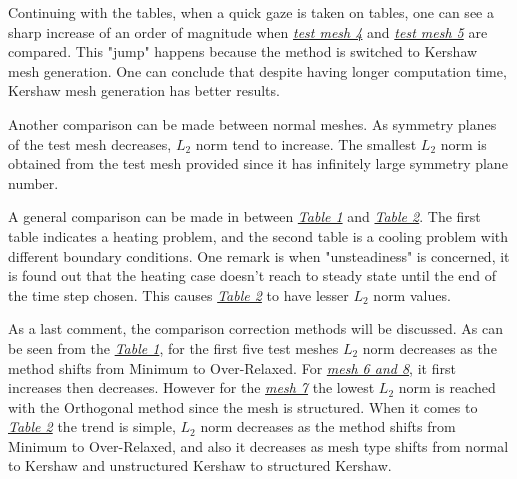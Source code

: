 \documentclass[a4paper, 12pt]{article}
\begin{document}
Continuing with the tables, when a quick gaze is taken on tables, one can see a sharp increase of an order of magnitude when \hyperref[mesh4]{\textit{test mesh 4}}  and \hyperref[mesh5]{\textit{test mesh 5}} are compared. This "jump" happens because the method is switched to Kershaw mesh generation. One can conclude that despite having longer computation time, Kershaw mesh generation has better results. \\\par

Another comparison can be made between normal meshes. As symmetry planes of the test mesh decreases, $L_2$ norm tend to increase. The smallest $L_2$ norm is obtained from the test mesh provided since it has infinitely large symmetry plane number. \\\par

A general comparison can be made in between \hyperref[hot]{\textit{Table 1}} and \hyperref[cold]{\textit{Table 2}}. The first table indicates a heating problem, and the second table is a cooling problem with different boundary conditions. One remark is when "unsteadiness" is concerned, it is found out that the heating case doesn't reach to steady state until the end of the time step chosen. This causes \hyperref[cold]{\textit{Table 2}} to have lesser $L_2$ norm values.\\\par

As a last comment, the comparison correction methods will be discussed. As can be seen from the \hyperref[hot]{\textit{Table 1}}, for the first five test meshes $L_2$ norm decreases as the method shifts from Minimum to Over-Relaxed. For \hyperref[mesh]{\textit{mesh 6 and 8}}, it first increases then decreases. However for the \hyperref[mesh]{\textit{mesh 7}} the lowest $L_2$ norm is reached with the Orthogonal method since the mesh is structured. When it comes to \hyperref[cold]{\textit{Table 2}} the trend is simple, $L_2$ norm decreases as the method shifts from Minimum to Over-Relaxed, and also it decreases as mesh type shifts from normal to Kershaw and unstructured Kershaw to structured Kershaw.

\newpage
\printbibliography
\newpage
\appendix
\end{document}
